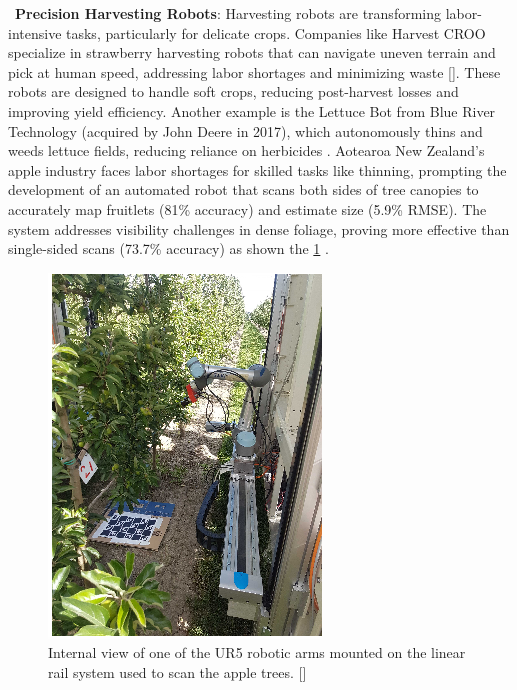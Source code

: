 \textbullet \,\textbf{ Precision Harvesting Robots}:
Harvesting robots are transforming labor-intensive tasks, particularly for delicate crops. Companies like Harvest CROO specialize in strawberry harvesting robots that can navigate uneven terrain and pick at human speed, addressing labor shortages and minimizing waste [\cite{BuiltInAgRobots}]. These robots are designed to handle soft crops, reducing post-harvest losses and improving yield efficiency. Another example is the Lettuce Bot from Blue River Technology (acquired by John Deere in 2017), which autonomously thins and weeds lettuce fields, reducing reliance on herbicides . Aotearoa New Zealand’s apple industry faces labor shortages for skilled tasks like thinning, prompting the development of an automated robot that scans both sides of tree canopies to accurately map fruitlets (81\% accuracy) and estimate size (5.9\% RMSE). The system addresses visibility challenges in dense foliage, proving more effective than single-sided scans (73.7\% accuracy) as shown the \ref{fig:applerobot} .

\begin{figure}
    \centering
    \includegraphics[width=0.5\linewidth]{pictures/robot_pickingapple.png}
    \caption{Internal view of one of the UR5 robotic arms mounted on the linear rail system used to scan the apple trees. [\cite{robotApple}]}
    \label{fig:applerobot}
\end{figure}

